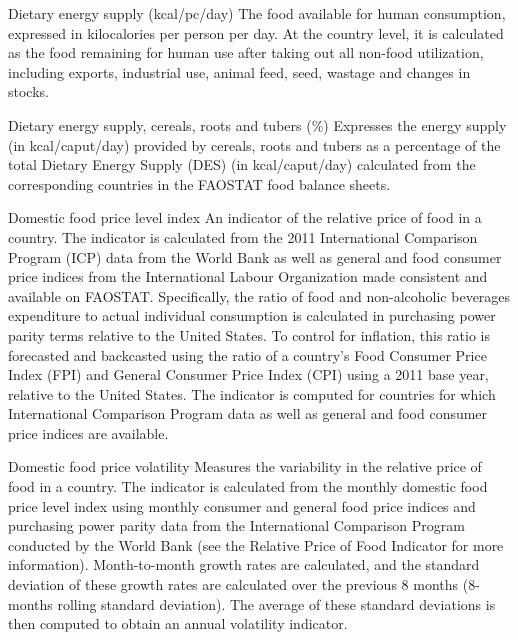 \begin{MetadataCollection} {}
\begin{metadata}{Dietary energy supply (kcal/pc/day)} {}
The food available for human consumption, expressed in kilocalories per person per day. At the country level, it is calculated as the food remaining for human use after taking out all non-food utilization, including exports, industrial use, animal feed, seed, wastage and changes in stocks.
\end{metadata}

\begin{metadata}{Dietary energy supply, cereals, roots and tubers (\%)} {}
Expresses the energy supply (in kcal/caput/day) provided by cereals, roots and tubers as a percentage of the total Dietary Energy Supply (DES) (in kcal/caput/day) calculated from the corresponding countries in the FAOSTAT food balance sheets.
\end{metadata}

\begin{metadata}{Domestic food price level index} {}
An indicator of the relative price of food in a country. The indicator is calculated from the 2011 International Comparison Program (ICP) data from the World Bank as well as general and food consumer price indices from the International Labour Organization made consistent and available on FAOSTAT.  Specifically, the ratio of food and non-alcoholic beverages expenditure to actual individual consumption is calculated in purchasing power parity terms relative to  the United States. To control for inflation, this ratio is forecasted and backcasted using the ratio of a country's Food Consumer Price Index (FPI) and General Consumer Price Index (CPI) using a 2011 base year, relative to the United States. The indicator is computed for countries for which International Comparison Program data as well as general and food consumer price indices are available.
\end{metadata}

\begin{metadata}{Domestic food price volatility} {}
Measures the variability in the relative price of food in a country.  The indicator is calculated from the monthly domestic food price level index using monthly consumer and general food price indices and purchasing power parity data from the International Comparison Program conducted by the World Bank (see the Relative Price of Food Indicator for more information).  Month-to-month growth rates are calculated, and the standard deviation of these growth rates are calculated over the previous 8 months (8-months rolling standard deviation).  The average of these standard deviations is then computed to obtain an annual volatility indicator.
\end{metadata}


\end{MetadataCollection}
